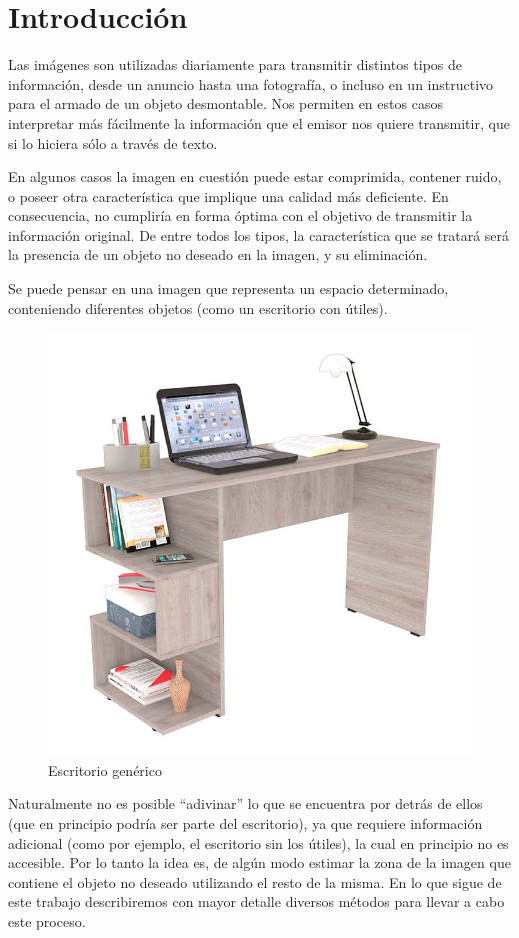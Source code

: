 \documentclass[conference]{IEEEtran}
\begin{document}
\section{Introducción}
Las imágenes son utilizadas diariamente para transmitir distintos tipos de información, desde un anuncio hasta una fotografía, o incluso en un instructivo para el armado de un objeto desmontable. Nos permiten en estos casos interpretar más fácilmente la información que el emisor nos quiere transmitir, que si lo hiciera sólo a través de texto.\par
En algunos casos la imagen en cuestión puede estar comprimida, contener ruido, o poseer otra característica que implique una calidad más deficiente. En consecuencia, no cumpliría en forma óptima con el objetivo de transmitir la información original. De entre todos los tipos, la característica que se tratará será la presencia de un objeto no deseado en la imagen, y su eliminación.\par
Se puede pensar en una imagen que representa un espacio determinado, conteniendo diferentes objetos (como un escritorio con útiles). 
\begin{figure}[!ht]
\begin{centering}
\includegraphics[scale=0.2]{ImagenesAux/desktop.jpg}
\par\end{centering}
\caption{Escritorio genérico}
\end{figure}
Naturalmente no es posible ``adivinar'' lo que se encuentra por detrás de ellos (que en principio podría ser parte del escritorio), ya que requiere información adicional (como por ejemplo, el escritorio sin los útiles), la cual en principio no es accesible. Por lo tanto la idea es, de algún modo estimar la zona de la imagen que contiene el objeto no deseado utilizando el resto de la misma. En lo que sigue de este trabajo describiremos con mayor detalle diversos métodos para llevar a cabo este proceso.
\end{document}
